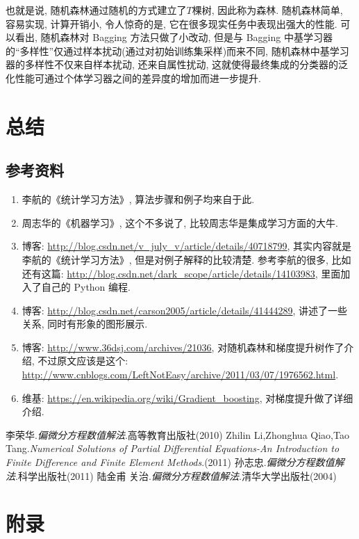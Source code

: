 \documentclass[a4paper,UTF8]{ctexart}
\theoremstyle{plain} \newtheorem{theorem}{定理}[section]
\theoremstyle{plain} \newtheorem{definition}{定义}[section]
\theoremstyle{plain} \newtheorem{lemma}{引理}[section]
\theoremstyle{plain} \newtheorem{proposition}{命题}[section]
\theoremstyle{plain} \newtheorem{example}{例}[section]
\theoremstyle{plain} \newtheorem{remark}{注}[section]
\theoremstyle{plain} \newtheorem{corollary}{推论}[section]
\begin{document}
也就是说, 随机森林通过随机的方式建立了$T$棵树, 因此称为森林. 随机森林简单, 容易实现, 计算开销小, 令人惊奇的是, 它在很多现实任务中表现出强大的性能. 可以看出, 随机森林对 Bagging 方法只做了小改动, 但是与 Bagging 中基学习器的“多样性”仅通过样本扰动(通过对初始训练集采样)而来不同, 随机森林中基学习器的多样性不仅来自样本扰动, 还来自属性扰动, 这就使得最终集成的分类器的泛化性能可通过个体学习器之间的差异度的增加而进一步提升.









\section{总结}
\subsection{参考资料}
\begin{enumerate}[(1)]
\item 李航的《统计学习方法》, 算法步骤和例子均来自于此.

\item 周志华的《机器学习》, 这个不多说了, 比较周志华是集成学习方面的大牛.

\item 博客: \url{http://blog.csdn.net/v_july_v/article/details/40718799}, 其实内容就是李航的《统计学习方法》, 但是对例子解释的比较清楚. 参考李航的很多, 比如还有这篇: \url{http://blog.csdn.net/dark_scope/article/details/14103983}, 里面加入了自己的 Python 编程.

\item 博客: \url{http://blog.csdn.net/carson2005/article/details/41444289}, 讲述了一些关系, 同时有形象的图形展示.

\item 博客: \url{http://www.36dsj.com/archives/21036}, 对随机森林和梯度提升树作了介绍, 不过原文应该是这个: \url{http://www.cnblogs.com/LeftNotEasy/archive/2011/03/07/1976562.html}.

\item 维基: \url{https://en.wikipedia.org/wiki/Gradient_boosting}, 对梯度提升做了详细介绍.
\end{enumerate}





\begin{thebibliography}{4}
   李荣华.\emph{偏微分方程数值解法}.高等教育出版社(2010) 
   Zhilin Li,Zhonghua Qiao,Tao Tang.\emph{Numerical Solutions of Partial Differential Equations-An Introduction to Finite Difference and Finite Element Methods}.(2011)
   孙志忠.\emph{偏微分方程数值解法}.科学出版社(2011)
   陆金甫 关治.\emph{偏微分方程数值解法}.清华大学出版社(2004)
  
\end{thebibliography}

\newpage

\section*{附录}
\end{document}
